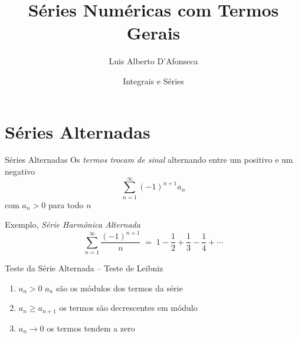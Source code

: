 
\usepackage{apresentacao}
\usepackage{mathconfig}
\usepackage{tabto}

\makeatletter
\graphicspath  {{./figs/}}
\makeatother

\setcounter{exemplo}{0}

\title {Séries Numéricas com Termos Gerais}
\author{\large Luis Alberto D'Afonseca}
\date  {Integrais e Séries}



\begin{frame}
    \titlepage
\end{frame}

\section{Séries Alternadas}

\begin{frame}{Séries Alternadas}
  Os \emph{termos trocam de sinal}
  \pause
  alternando entre um positivo e um negativo
  \[ \sum_{n=1}^\infty (-1)^{n+1} a_n \]
  com $a_n >0$ para todo $n$

  \pause
  \vspace{\baselineskip}
  Exemplo, \emph{Série Harmônica Alternada}
  \[
    \sum_{n=1}^\infty \frac{(-1)^{n+1}}{n}
    \;=\; 1 - \frac{1}{2} + \frac{1}{3} - \frac{1}{4} + \cdots
  \]
\end{frame}

\begin{frame}{Teste da Série Alternada -- Teste de Leibniz}

  \vspace{0.5\baselineskip}
  \begin{enumerate}[<+->]
      \item $a_n>0$           \tabto{30mm} $a_n$ são os módulos dos termos da série  \\[2mm]
      \item $a_n\geq a_{n+1}$ \tabto{30mm} os termos são decrescentes em módulo      \\[2mm]
      \item $a_n\to 0$        \tabto{30mm} os termos tendem a zero
  \end{enumerate}

\end{frame}

